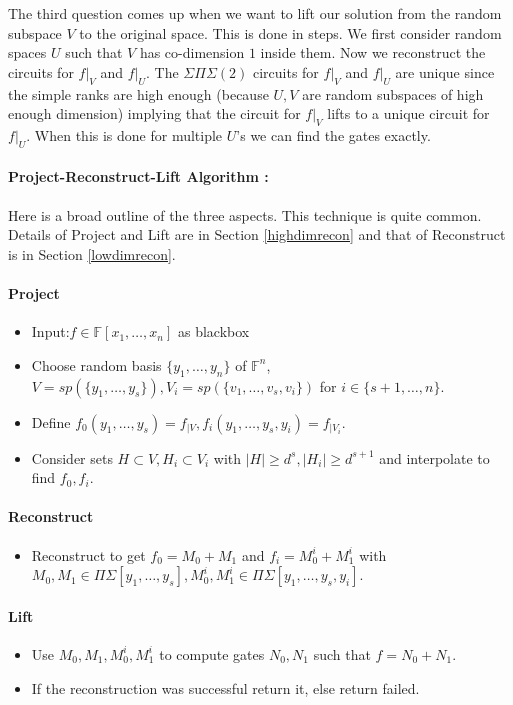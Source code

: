 \documentclass[letterpaper,USenglish,numberwithinsect]{lipics}
\newcommand{\F}{\mathbb{F}}
\begin{document}
The third question comes up when we want to lift our solution from the random subspace $V$ to the original space. This
is done in steps. We first consider random spaces $U$ such that $V$ has co-dimension $1$ inside them. Now we reconstruct
the circuits for $f|_{V}$ and $f|_{U}$. The $\Sigma\Pi\Sigma(2)$ circuits for $f|_{V}$ and $f|_{U}$ are unique since
the simple ranks are high enough (because $U,V$ are random subspaces of high enough dimension)
implying that the circuit for $f|_{V}$ lifts to a unique circuit for $f|_{U}$. When this is done for multiple $U$'s we can
find the gates exactly.

\begin{framed}
\paragraph{Project-Reconstruct-Lift Algorithm :}
Here is a broad outline of the three aspects. This technique is quite common. Details of Project and Lift are in
Section \ref{highdimrecon} and that of Reconstruct is in Section \ref{lowdimrecon}.
\paragraph{Project}
\begin{itemize}
 \item Input:$f \in \F[x_1,\ldots,x_n]$ as blackbox
\item  Choose random basis $\{y_1,\ldots,y_n\}$ of $\F^n$, $V = sp(\{y_1,\ldots,y_s\}), V_i =sp(\{v_1,\ldots,v_s,v_i\})$ for $i\in \{s+1,\ldots,n\}$.
\item Define $f_0(y_1,\ldots,y_s) = f_{|V}, f_i(y_1,\ldots,y_s,y_i) = f_{|V_i}$.
\item Consider sets $H\subset V,H_i\subset V_i$ with $|H|\geq d^s,|H_i|\geq d^{s+1}$ and interpolate to find $f_0,f_i$.
\end{itemize}
\paragraph{Reconstruct}
\begin{itemize}
 \item Reconstruct to get $f_0 = M_0+M_1$ and $f_i = M^i_0 + M^i_1$ with $M_0,M_1\in \Pi\Sigma[y_1,\ldots,y_s], M^i_0,M^i_1\in
 \Pi\Sigma[y_1,\ldots,y_s,y_i]$.
\end{itemize}
\paragraph{Lift}
\begin{itemize}
\item Use $M_0,M_1,M^i_0,M^i_1$ to compute gates $N_0,N_1$ such that $f=N_0+N_1$.
\item If the reconstruction was successful return it, else return failed.
\end{itemize}
\end{framed}
\end{document}
